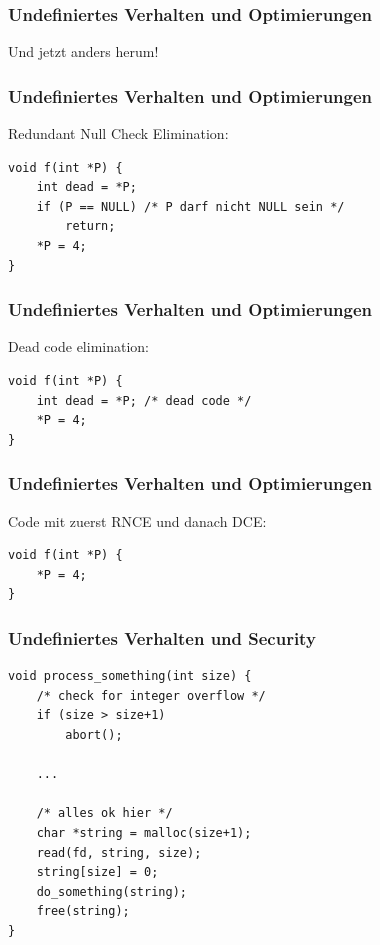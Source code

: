 \documentclass[12pt,compress]{beamer}
\begin{document}
\begin{frame}[fragile]
\frametitle{Undefiniertes Verhalten und Optimierungen}

\begin{center}
Und jetzt anders herum!
\end{center}

\end{frame}


\begin{frame}[fragile]
\frametitle{Undefiniertes Verhalten und Optimierungen}

Redundant Null Check Elimination:

\vfill

\begin{lstlisting}
void f(int *P) {
    int dead = *P;
    if (P == NULL) /* P darf nicht NULL sein */
        return;
    *P = 4;
}
\end{lstlisting}
\end{frame}


\begin{frame}[fragile]
\frametitle{Undefiniertes Verhalten und Optimierungen}

Dead code elimination:

\vfill

\begin{lstlisting}
void f(int *P) {
    int dead = *P; /* dead code */
    *P = 4;
}
\end{lstlisting}
\end{frame}


\begin{frame}[fragile]
\frametitle{Undefiniertes Verhalten und Optimierungen}

Code mit zuerst RNCE und danach DCE:

\vfill

\begin{lstlisting}
void f(int *P) {
    *P = 4;
}
\end{lstlisting}
\end{frame}


\begin{frame}[fragile]
\frametitle{Undefiniertes Verhalten und Security}
\begin{lstlisting}
void process_something(int size) {
    /* check for integer overflow */
    if (size > size+1)
        abort();
    
    ...

    /* alles ok hier */
    char *string = malloc(size+1);
    read(fd, string, size);
    string[size] = 0;
    do_something(string);
    free(string);
}
\end{lstlisting}
\end{frame}
\end{document}

